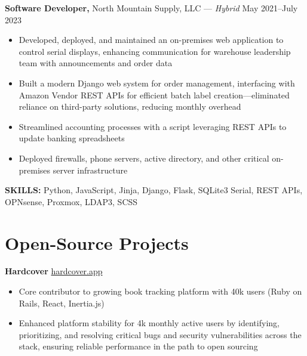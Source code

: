\documentclass[11pt]{article}       %
\begin{document}
\textbf{Software Developer,} {North Mountain Supply, LLC} --- \textit{Hybrid} \hfill May 2021--July 2023 \\
\vspace{-9pt}
\begin{itemize}[leftmargin=0.35in]
  \item Developed, deployed, and maintained an on-premises web application to control serial displays, enhancing communication for warehouse leadership team with announcements and order data
  \item Built a modern Django web system for order management, interfacing with Amazon Vendor REST APIs for efficient batch label creation---eliminated reliance on third-party solutions, reducing monthly overhead
  \item Streamlined accounting processes with a script leveraging REST APIs to update banking spreadsheets
  \item Deployed firewalls, phone servers, active directory, and other critical on-premises server infrastructure
\end{itemize}
\vspace{-9pt}
\textbf{SKILLS:} Python, JavaScript, Jinja, Django, Flask, SQLite3 Serial, REST APIs, OPNsense, Proxmox, LDAP3, SCSS

\vspace{-9pt}


\section*{Open-Source Projects}
\textbf{Hardcover} \hfill \href{https://hardcover.app/}{hardcover.app} \\
\vspace{-9pt}
\begin{itemize}
  \item Core contributor to growing book tracking platform with 40k users (Ruby on Rails, React, Inertia.js)
  \item Enhanced platform stability for 4k monthly active users by identifying, prioritizing, and resolving critical bugs and security vulnerabilities across the stack, ensuring reliable performance in the path to open sourcing
\end{itemize}

\end{document}
